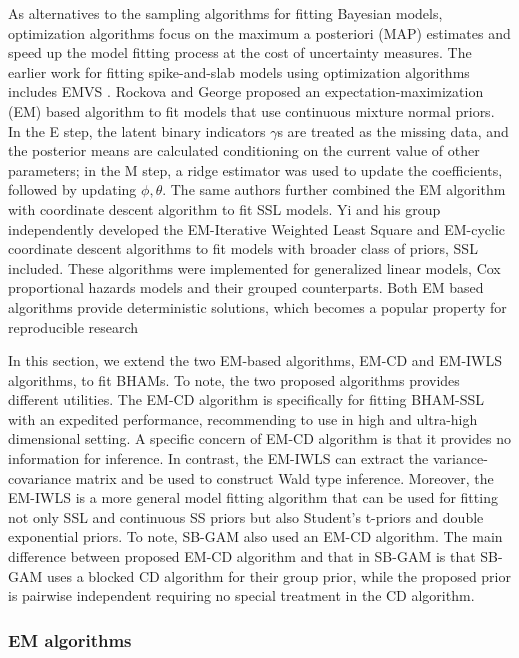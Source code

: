 \documentclass[AMA,STIX1COL,]{WileyNJD-v2}
\begin{document}
As alternatives to the sampling algorithms for fitting Bayesian models,
optimization algorithms focus on the maximum a posteriori (MAP)
estimates and speed up the model fitting process at the cost of
uncertainty measures. The earlier work for fitting spike-and-slab models
using optimization algorithms includes EMVS \citep{Rockova2014a}.
Rockova and George\citep{Rockova2014a} proposed an
expectation-maximization (EM) based algorithm to fit models that use
continuous mixture normal priors. In the E step, the latent binary
indicators \(\gamma\)s are treated as the missing data, and the
posterior means are calculated conditioning on the current value of
other parameters; in the M step, a ridge estimator was used to update
the coefficients, followed by updating \(\phi, \theta\). The same
authors \citep{Rockova2018b, Rockova2018} further combined the EM
algorithm with coordinate descent algorithm to fit SSL models. Yi and
his group independently developed the EM-Iterative Weighted Least Square
and EM-cyclic coordinate descent algorithms to fit models with broader
class of priors, SSL included.\citep{Yi2019} These algorithms were
implemented for generalized linear models\citep{Tang2017a}, Cox
proportional hazards models \citep{Tang2017} and their grouped
counterparts\citep{Tang2018, Tang2019}. Both EM based algorithms provide
deterministic solutions, which becomes a popular property for
reproducible research

In this section, we extend the two EM-based algorithms, EM-CD and
EM-IWLS algorithms, to fit BHAMs. To note, the two proposed algorithms
provides different utilities. The EM-CD algorithm is specifically for
fitting BHAM-SSL with an expedited performance, recommending to use in
high and ultra-high dimensional setting. A specific concern of EM-CD
algorithm is that it provides no information for inference. In contrast,
the EM-IWLS can extract the variance-covariance matrix and be used to
construct Wald type inference. Moreover, the EM-IWLS is a more general
model fitting algorithm that can be used for fitting not only SSL and
continuous SS priors but also Student's t-priors and double exponential
priors. To note, SB-GAM\citep{Bai2020, Bai2021} also used an EM-CD
algorithm. The main difference between proposed EM-CD algorithm and that
in SB-GAM is that SB-GAM uses a blocked CD algorithm for their group
prior, while the proposed prior is pairwise independent requiring no
special treatment in the CD algorithm.

\hypertarget{em-algorithms}{%
\subsubsection{EM algorithms}\label{em-algorithms}}
\end{document}
